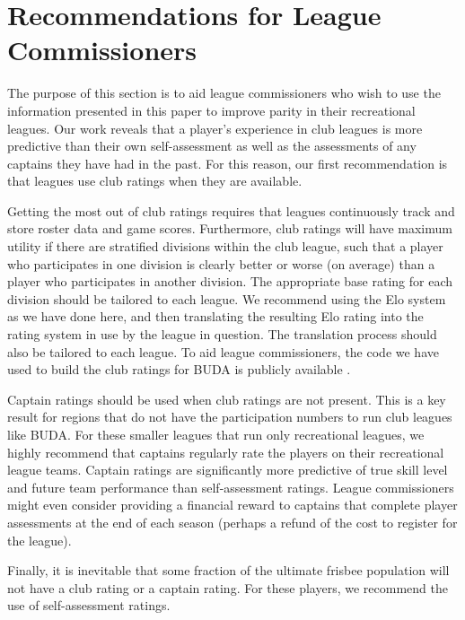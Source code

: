 \section{Recommendations for League Commissioners}\label{sec:recommendations}

The purpose of this section is to aid league commissioners who wish to use the information presented in this paper to improve parity in their recreational leagues. Our work reveals that a player's experience in club leagues is more predictive than their own self-assessment as well as the assessments of any captains they have had in the past. For this reason, our first recommendation is that leagues use club ratings when they are available. 

Getting the most out of club ratings requires that leagues continuously track and store roster data and game scores. Furthermore, club ratings will have maximum utility if there are stratified divisions within the club league, such that a player who participates in one division is clearly better or worse (on average) than a player who participates in another division. The appropriate base rating for each division should be tailored to each league. We recommend using the Elo system as we have done here, and then translating the resulting Elo rating into the rating system in use by the league in question. The translation process should also be tailored to each league. To aid league commissioners, the code we have used to build the club ratings for BUDA is publicly available \cite{shanegit}.

Captain ratings should be used when club ratings are not present. This is a key result for regions that do not have the participation numbers to run club leagues like BUDA. For these smaller leagues that run only recreational leagues, we highly recommend that captains regularly rate the players on their recreational league teams. Captain ratings are significantly more predictive of true skill level and future team performance than self-assessment ratings. League commissioners might even consider providing a financial reward to captains that complete player assessments at the end of each season (perhaps a refund of the cost to register for the league).

Finally, it is inevitable that some fraction of the ultimate frisbee population will not have a club rating or a captain rating. For these players, we recommend the use of self-assessment ratings.